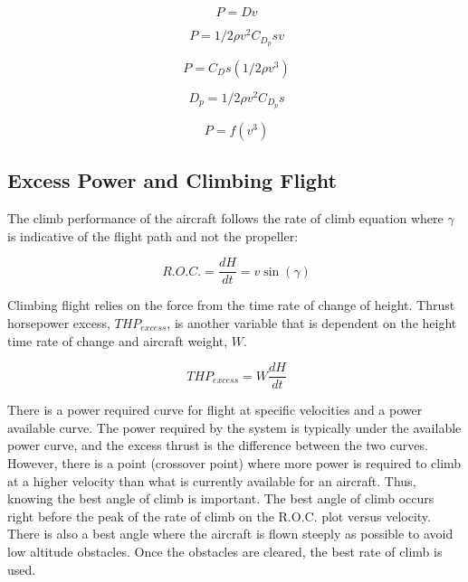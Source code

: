 \documentclass[conf]{new-aiaa}
\begin{document}
\begin{equation} \label{eq5}
\ P = Dv
\end{equation}

\begin{equation} \label{eq6}
\ P = 1/2 \rho v^2 C_{D_p} s v
\end{equation}

\begin{equation} \label{eq7}
\ P = C_D s (1/2 \rho v^3)
\end{equation}

\begin{equation} \label{eq8}
\ D_p = 1/2 \rho v^2 C_{D_p} s
\end{equation}

\begin{equation} \label{eq9}
\ P = f (v^3)
\end{equation}

\subsection{Excess Power and Climbing Flight}
The climb performance of the aircraft follows the rate of climb equation where $\gamma$ is indicative of the flight path and not the propeller:

\begin{equation} \label{eq10}
\ R.O.C. = \frac{dH}{dt} = v \sin(\gamma)
\end{equation}

Climbing flight relies on the force from the time rate of change of height. Thrust horsepower excess, $THP_{excess}$, is another variable that is dependent on the height time rate of change and aircraft weight, $W$. 

\begin{equation} \label{eq11}
\ THP_{excess} = W \frac{dH}{dt}
\end{equation}

There is a power required curve for flight at specific velocities and a power available curve. The power required by the system is typically under the available power curve, and the excess thrust is the difference between the two curves. However, there is a point (crossover point) where more power is required to climb at a higher velocity than what is currently available for an aircraft. Thus, knowing the best angle of climb is important. The best angle of climb occurs right before the peak of the rate of climb on the R.O.C. plot versus velocity. There is also a best angle where the aircraft is flown steeply as possible to avoid low altitude obstacles. Once the obstacles are cleared, the best rate of climb is used. 
\end{document}
